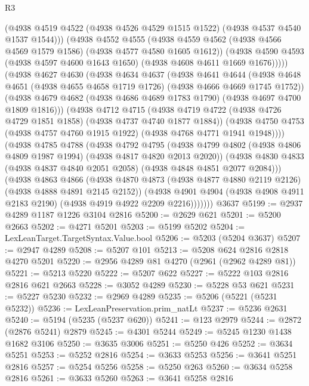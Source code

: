 \begin{lexlean}{R3}
\begin{coremodule}
              (@4938 @4519 @4522 (@4938 @4526 @4529 @1515 @1522) (@4938 @4537 @4540 @1537 @1544)))
            (@4938
              @4552
              @4555
              (@4938 @4559 @4562 (@4938 @4566 @4569 @1579 @1586) (@4938 @4577 @4580 @1605 @1612))
              (@4938 @4590 @4593 (@4938 @4597 @4600 @1643 @1650) (@4938 @4608 @4611 @1669 @1676)))))
        (@4938
          @4627
          @4630
          (@4938
            @4634
            @4637
            (@4938
              @4641
              @4644
              (@4938 @4648 @4651 (@4938 @4655 @4658 @1719 @1726) (@4938 @4666 @4669 @1745 @1752))
              (@4938 @4679 @4682 (@4938 @4686 @4689 @1783 @1790) (@4938 @4697 @4700 @1809 @1816)))
            (@4938
              @4712
              @4715
              (@4938 @4719 @4722 (@4938 @4726 @4729 @1851 @1858) (@4938 @4737 @4740 @1877 @1884))
              (@4938 @4750 @4753 (@4938 @4757 @4760 @1915 @1922) (@4938 @4768 @4771 @1941 @1948))))
          (@4938
            @4785
            @4788
            (@4938
              @4792
              @4795
              (@4938 @4799 @4802 (@4938 @4806 @4809 @1987 @1994) (@4938 @4817 @4820 @2013 @2020))
              (@4938 @4830 @4833 (@4938 @4837 @4840 @2051 @2058) (@4938 @4848 @4851 @2077 @2084)))
            (@4938
              @4863
              @4866
              (@4938 @4870 @4873 (@4938 @4877 @4880 @2119 @2126) (@4938 @4888 @4891 @2145 @2152))
              (@4938
                @4901
                @4904
                (@4938 @4908 @4911 @2183 @2190)
                (@4938 @4919 @4922 @2209 @2216)))))))
    @3637
@5199 := @2937 @4289 @1187 @1226 @3104 @2816
@5200 := @2629 @621
@5201 := @5200 @2663
@5202 := @4271 @5201
@5203 := @5199 @5202
@5204 := LexLeanTarget.TargetSyntax.Value.bool
@5206 := @5203 (@5204 @3637)
@5207 := @2947 @4289
@5208 := @5207 @101
@5213 := @5208 @624 @2816 @2818 @4270 @5201
@5220 := @2956 @4289 @81 @4270 (@2961 (@2962 @4289 @81))
@5221 := @5213 @5220
@5222 := @5207 @622
@5227 := @5222 @103 @2816 @2816 @621 @2663
@5228 := @3052 @4289
@5230 := @5228 @53 @621
@5231 := @5227 @5230
@5232 := @2969 @4289
@5235 := @5206 (@5221 (@5231 @5232))
@5236 := LexLeanPreservation.prim_natLt
@5237 := @5236 @2631
@5240 := @5194 (@5235 (@5237 @620))
@5241 := @123 @2979
@5244 := @2872 (@2876 @5241) @2879
@5245 := @4301 @5244
@5249 := @5245 @1230 @1438 @1682 @3106
@5250 := @3635 @3006
@5251 := @5250 @426
@5252 := @3634 @5251
@5253 := @5252 @2816
@5254 := @3633 @5253
@5256 := @3641 @5251 @2816
@5257 := @5254 @5256
@5258 := @5250 @263
@5260 := @3634 @5258 @2816
@5261 := @3633 @5260
@5263 := @3641 @5258 @2816

\end{coremodule}
\end{lexlean}
